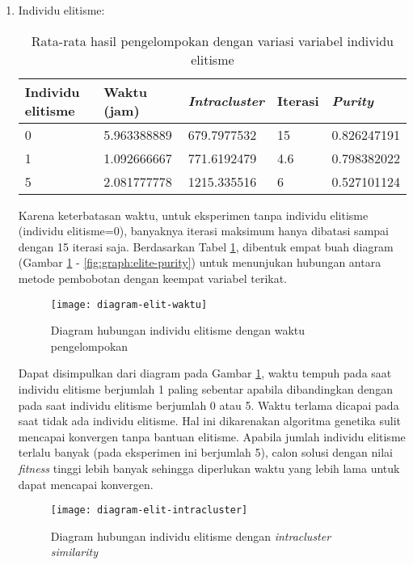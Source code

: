 \begin{enumerate}
		\newpage
		\item Individu elitisme:
		\begin{table}[H]
			\centering
			\begin{tabular}{|l|l|l|l|l|} \hline
				Individu elitisme & Waktu (jam) & \textit{Intracluster} & Iterasi & \textit{Purity} \\ \hline
				0 & 5.963388889 & 679.7977532 & 15  & 0.826247191 \\ \hline
				1 & 1.092666667 & 771.6192479 & 4.6 & 0.798382022 \\ \hline
				5 & 2.081777778 & 1215.335516 & 6   & 0.527101124 \\ \hline
			\end{tabular}
			\caption{Rata-rata hasil pengelompokan dengan variasi variabel individu elitisme}
			\label{tbl:exp-elitism}
		\end{table}
		
		Karena keterbatasan waktu, untuk eksperimen tanpa individu elitisme (individu elitisme=0), banyaknya iterasi maksimum hanya dibatasi sampai dengan 15 iterasi saja. Berdasarkan Tabel \ref{tbl:exp-elitism}, dibentuk empat buah diagram (Gambar \ref{fig:graph:elite-time} - \ref{fig:graph:elite-purity}) untuk menunjukan hubungan antara metode pembobotan dengan keempat variabel terikat.
		
		\begin{figure}[H]
			\centering
			\texttt{[image: diagram-elit-waktu]}
			\caption{Diagram hubungan individu elitisme dengan waktu pengelompokan}
			\label{fig:graph:elite-time}
		\end{figure}
		
		Dapat disimpulkan dari diagram pada Gambar \ref{fig:graph:elite-time}, waktu tempuh pada saat individu elitisme berjumlah 1 paling sebentar apabila dibandingkan dengan pada saat individu elitisme berjumlah 0 atau 5. Waktu terlama dicapai pada saat tidak ada individu elitisme. Hal ini dikarenakan algoritma genetika sulit mencapai konvergen tanpa bantuan elitisme. Apabila jumlah individu elitisme terlalu banyak (pada eksperimen ini berjumlah 5), calon solusi dengan nilai \textit{fitness} tinggi lebih banyak sehingga diperlukan waktu yang lebih lama untuk dapat mencapai konvergen.
		
		\begin{figure}[H]
			\centering
			\texttt{[image: diagram-elit-intracluster]}
			\caption{Diagram hubungan individu elitisme dengan \textit{intracluster similarity}}
			\label{fig:graph:elite-intra}
		\end{figure}
		

\end{enumerate}
